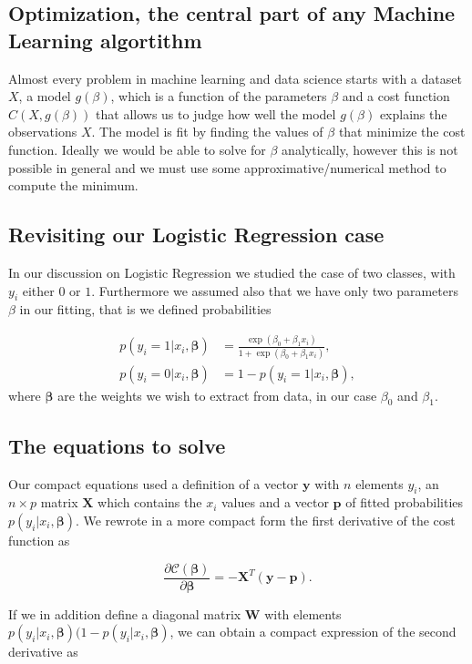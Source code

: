 \documentclass[%
oneside,                 %
final,                   %
10pt]{article}
\begin{document}
\subsection*{Optimization, the central part of any Machine Learning algortithm}

Almost every problem in machine learning and data science starts with
a dataset $X$, a model $g(\beta)$, which is a function of the
parameters $\beta$ and a cost function $C(X, g(\beta))$ that allows
us to judge how well the model $g(\beta)$ explains the observations
$X$. The model is fit by finding the values of $\beta$ that minimize
the cost function. Ideally we would be able to solve for $\beta$
analytically, however this is not possible in general and we must use
some approximative/numerical method to compute the minimum.


\subsection*{Revisiting our Logistic Regression case}

In our discussion on Logistic Regression we studied the 
case of
two classes, with $y_i$ either
$0$ or $1$. Furthermore we assumed also that we have only two
parameters $\beta$ in our fitting, that is we
defined probabilities

\begin{align*}
p(y_i=1|x_i,\bm{\beta}) &= \frac{\exp{(\beta_0+\beta_1x_i)}}{1+\exp{(\beta_0+\beta_1x_i)}},\nonumber\\
p(y_i=0|x_i,\bm{\beta}) &= 1 - p(y_i=1|x_i,\bm{\beta}),
\end{align*}
where $\bm{\beta}$ are the weights we wish to extract from data, in our case $\beta_0$ and $\beta_1$. 

\subsection*{The equations to solve}

Our compact equations used a definition of a vector $\bm{y}$ with $n$
elements $y_i$, an $n\times p$ matrix $\bm{X}$ which contains the
$x_i$ values and a vector $\bm{p}$ of fitted probabilities
$p(y_i\vert x_i,\bm{\beta})$. We rewrote in a more compact form
the first derivative of the cost function as

\[
\frac{\partial \mathcal{C}(\bm{\beta})}{\partial \bm{\beta}} = -\bm{X}^T\left(\bm{y}-\bm{p}\right). 
\]

If we in addition define a diagonal matrix $\bm{W}$ with elements 
$p(y_i\vert x_i,\bm{\beta})(1-p(y_i\vert x_i,\bm{\beta})$, we can obtain a compact expression of the second derivative as 
\end{document}
